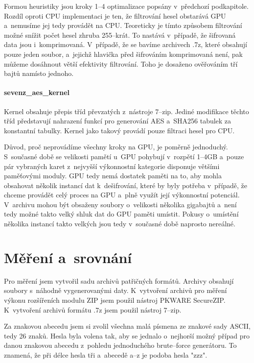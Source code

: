 Formou heuristiky jsou kroky 1--4 optimalizace popsány v~předchozí podkapitole. Rozdíl oproti
CPU implementaci je ten, že filtrování hesel obstarává GPU a~nemusíme jej tedy provádět na CPU.
Teoreticky je tímto způsobem filtrování možné snížit počet hesel zhruba 255--krát. To nastává
v~případě, že šifrovaná data jsou i~komprimovaná. V~případě, že se bavíme archivech .7z, které
obsahují pouze jeden soubor, a~jejichž hlavička před šifrováním komprimovaná není, pak můžeme
dosáhnout větší efektivity filtrování. Toho je dosaženo ověřováním tří bajtů namísto jednoho.

\subsubsection{sevenz\_aes\_kernel}
Kernel obsahuje přepis tříd převzatých z~nástroje 7--zip. Jediné modifikace těchto tříd představují
nahrazení funkcí pro generování AES a~SHA256 tabulek za konstantní tabulky. Kernel jako
takový provádí pouze filtraci hesel pro CPU. 

Důvod, proč neprovádíme všechny kroky na GPU, je poměrně jednoduchý. S~současné době se velikosti
pamětí u~GPU pohybují v~rozpětí 1--4GB a~pouze pár vybraných karet z~nejvyšší výkonnostní kategorie
disponuje většími paměťovými moduly. GPU tedy nemá dostatek paměti na to, aby mohla obsahovat
několik instancí dat k~dešifrování, které by byly potřeba v~případě, že chceme provádět celý proces na
GPU a~plně využít její výkonnostní potenciál. V~archivu mohou být obsaženy soubory
o~velikosti několika gigabajtů a~není tedy možné takto velký shluk dat do GPU paměti umístit. Pokusy
o~umístění několika instancí takto velkých jsou tedy v~současné době naprosto nereálné. 

\chapter{Měření a~srovnání}
\label{ch:mereni_a_srovnani}
Pro měření jsem vytvořil sadu archivů patřičných formátů. Archivy obsahují soubory s~náhodně
vygenerovanými daty. K~vytvoření archivů pro měření výkonu rozšířeních modulu ZIP jsem použil
nástroj PKWARE SecureZIP. K~vytvoření archivů formátu .7z jsem použil nástroj 7--zip.

Za znakovou abecedu jsem si zvolil všechna malá písmena ze znakové sady ASCII, tedy 26 znaků.
Hesla byla volena tak, aby se jednalo o~nejhorší možný případ pro danou znakovou abecedu z~pohledu
jednoduchého brute--force generátoru. To znamená, že při délce hesla tři a~abecedě a--z je podoba
hesla "zzz".

